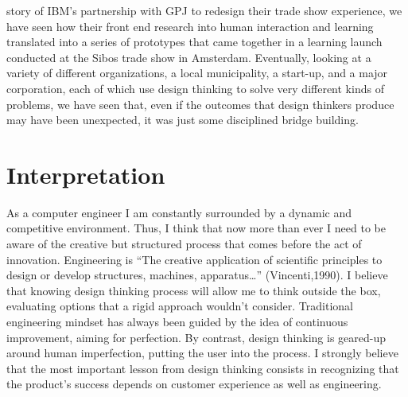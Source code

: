 \documentclass[a4paper,9pt]{article}
\begin{document}
story of IBM's partnership with GPJ to redesign their trade show experience, we have seen how their front end research into human interaction and learning translated into a series of prototypes that came together in a learning launch conducted at the Sibos trade show in Amsterdam. Eventually, looking at a variety of different organizations, a local municipality, a start-up, and a major corporation, each of which use design thinking to solve very different kinds of problems, we have seen that, even if the outcomes that design thinkers produce may have been unexpected, it was just some disciplined bridge building.

\section{Interpretation}
As a computer engineer I am constantly surrounded by a dynamic and competitive environment. Thus, I think that now more than ever I need to be aware of the creative but structured process that comes before the act of innovation. Engineering is “The creative application of scientific principles to design or develop structures, machines, apparatus…” (Vincenti,1990). I believe that knowing design thinking process will allow me to think outside the box, evaluating options that a rigid approach wouldn’t consider. Traditional engineering mindset has always been guided by the idea of  continuous improvement, aiming for perfection. By contrast, design thinking is geared-up around human imperfection, putting the user into the process. I strongly believe that the most important lesson from design thinking consists in recognizing that the product’s success depends on customer experience as well as engineering.
\end{document}
